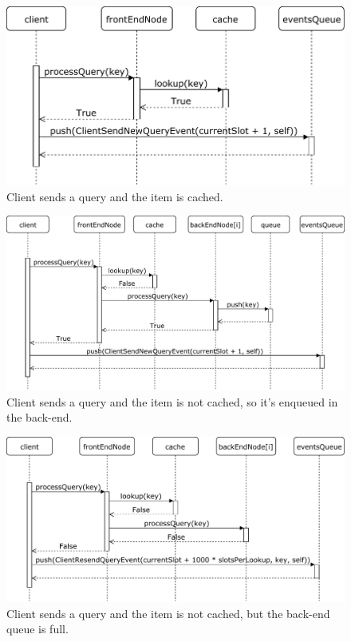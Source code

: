 \documentclass[10pt,letterpaper]{article}
\begin{document}
\begin{figure}
	\centering
	\includegraphics[scale=0.75]{img/query_hit.pdf}
	\caption{Client sends a query and the item is cached.}
	\label{fig:query_hit}
\end{figure}

\begin{figure}
	\centering
	\includegraphics[scale=0.75]{img/query_miss.pdf}
	\caption{Client sends a query and the item is not cached, so it's enqueued in the back-end.}
	\label{fig:query_miss}
\end{figure}

\begin{figure}
	\centering
	\includegraphics[scale=0.75]{img/query_full_queue.pdf}
	\caption{Client sends a query and the item is not cached, but the back-end queue is full.}
	\label{fig:query_full_queue}
\end{figure}
\end{document}

